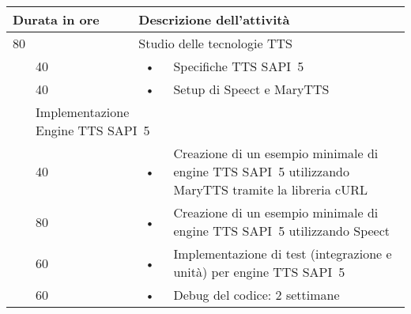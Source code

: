 \begin{center}
	
	\begin{tabular} {|l|l|c p{10cm}|}
		\hline
		\multicolumn{2}{|l|}{\textbf{Durata in ore}}		&	\multicolumn{2}{l|}{\textbf{Descrizione dell'attività}}\\
		\hline
		\multicolumn{2}{|l|}{80}	&	\multicolumn{2}{l|}{Studio delle tecnologie TTS}\\
		\hline
		\multirow{3}{1cm}{ }    &            40            &            \hspace{5mm}•\hspace{2mm}            &  Specifiche TTS SAPI~5\\
		\cline{2-2}
		&            40            &            \hspace{5mm}•\hspace{2mm}            &            Setup di Speect e MaryTTS\\
		\hline
		
		\multicolumn{2}{|l|}{240}	&	\multicolumn{2}{l|}{Implementazione Engine TTS SAPI~5}\\
		\hline
		
		\multirow{3}{1cm}{ }    &            40            &            \hspace{5mm}•\hspace{2mm}            & Creazione di un esempio minimale di engine TTS SAPI~5 utilizzando MaryTTS tramite la libreria cURL \\
		\cline{2-2}
		&            80            &            \hspace{5mm}•\hspace{2mm}            &            Creazione di un esempio minimale di engine TTS SAPI~5 utilizzando Speect \\
		\cline{2-2}
		&            60            &            \hspace{5mm}•\hspace{2mm}            &            Implementazione di test (integrazione e unità) per engine TTS SAPI~5 \\
		\cline{2-2}
		&            60            &            \hspace{5mm}•\hspace{2mm}            &            Debug del codice: 2 settimane \\
		\hline
	\end{tabular}
	
\end{center}

